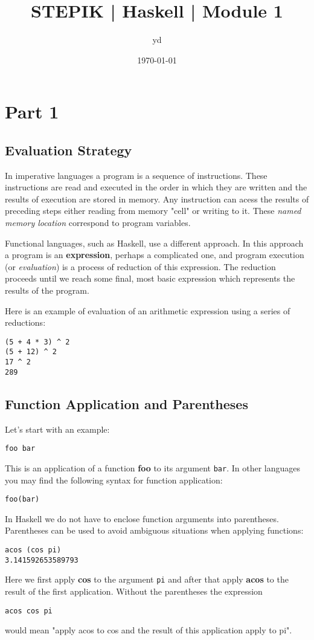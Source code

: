 \documentclass[11pt]{article}
\author{yd}
\date{\today}
\title{STEPIK | Haskell | Module 1}
\begin{document}
\maketitle
\tableofcontents

\section{Part 1}
\label{sec:org669f131}
\subsection{Evaluation Strategy}
\label{sec:org8ba3c41}
In imperative languages a program is a sequence of instructions.
These instructions are read and executed in the order in which they
are written and the results of execution are stored in memory. Any
instruction can acess the results of preceding steps either reading
from memory "cell" or writing to it. These \emph{named memory location}
correspond to program variables.

Functional languages, such as Haskell, use a different approach. In
this approach a program is an \textbf{expression}, perhaps a complicated one,
and program execution (or \emph{evaluation}) is a process of reduction of
this expression. The reduction proceeds until we reach some final,
most basic expression which represents the results of the program.

Here is an example of evaluation of an arithmetic expression using a
series of reductions:
\begin{verbatim}
(5 + 4 * 3) ^ 2
(5 + 12) ^ 2
17 ^ 2
289
\end{verbatim}

\subsection{Function Application and Parentheses}
\label{sec:org97952c6}
Let's start with an example:
\begin{verbatim}
foo bar
\end{verbatim}
This is an application of a function \textbf{foo} to its argument \texttt{bar}. In
other languages you may find the following syntax for function application:
\begin{verbatim}
foo(bar)
\end{verbatim}
In Haskell we do not have to enclose function arguments into
parentheses. Parentheses can be used to avoid ambiguous situations
when applying functions:
\begin{verbatim}
acos (cos pi)
3.141592653589793
\end{verbatim}
Here we first apply \textbf{cos} to the argument \texttt{pi} and after that apply
\textbf{acos} to the result of the first application. Without the parentheses
the expression
\begin{verbatim}
acos cos pi
\end{verbatim}
would mean "apply acos to cos and the result of this application apply
to pi".
\end{document}
